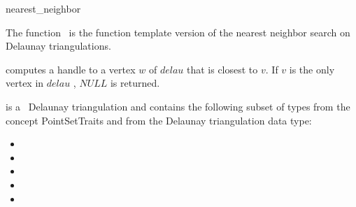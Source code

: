 \begin{ccRefFunction}{nearest_neighbor}

\ccDefinition

The function \ccRefName\ is the function template version of the nearest neighbor search on Delaunay
triangulations.
  



{computes a handle to a vertex $w$ of $delau$ that is closest to $v$.
If $v$ is the only vertex in $delau$ , $NULL$ is returned. }


 is a \cgal\ Delaunay triangulation and contains the following subset of types from the concept PointSetTraits and from
the Delaunay triangulation data type:
\begin{itemize}
  \item {}
  \item {}                 
  \item {}            
  \item {}             
  \item {}          
\end{itemize}
\end{ccRefFunction}



